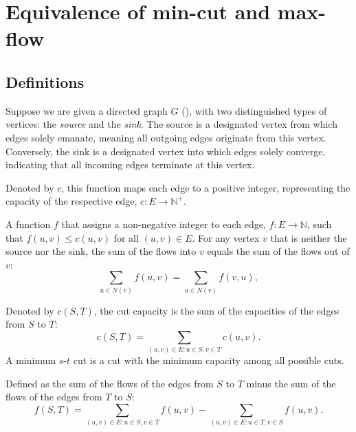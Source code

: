 \section{Equivalence of min-cut and max-flow}
\label{sec:mincut-maxflow}

\subsection{Definitions}

Suppose we are given a directed graph \( G \) (), with two distinguished types of vertices: the \emph{source} and the \emph{sink}. The source is a designated vertex from which edges solely emanate, meaning all outgoing edges originate from this vertex. Conversely, the sink is a designated vertex into which edges solely converge, indicating that all incoming edges terminate at this vertex.

\begin{definition}
    Denoted by \( c \), this function maps each edge to a positive integer, representing the capacity of the respective edge, \( c: E \to \mathbb{N}^+ \).
\end{definition}

\begin{definition}
    A function \( f \) that assigns a non-negative integer to each edge, \( f: E \to \mathbb{N} \), such that \( f(u, v) \leq c(u, v) \) for all \( (u, v) \in E \). For any vertex \( v \) that is neither the source nor the sink, the sum of the flows into \( v \) equals the sum of the flows out of \( v \):
    \[
    \sum_{u \in N(v)} f(u, v) = \sum_{u \in N(v)} f(v, u),
    \]
\end{definition}

\begin{definition}
    Denoted by \( c(S, T) \), the cut capacity is the sum of the capacities of the edges from \( S \) to \( T \):
    \[
    c(S, T) = \sum_{(u, v) \in E : u \in S, v \in T} c(u, v).
    \]
    A minimum \(s\)-\(t\) cut is a cut with the minimum capacity among all possible cuts.
\end{definition}

\begin{definition}
    Defined as the sum of the flows of the edges from \( S \) to \( T \) minus the sum of the flows of the edges from \( T \) to \( S \):
    \[
    f(S, T) = \sum_{(u, v) \in E : u \in S, v \in T} f(u, v) - \sum_{(u, v) \in E : u \in T, v \in S} f(u, v).
    \]
\end{definition}

